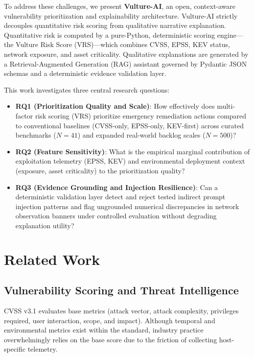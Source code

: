 \documentclass[conference]{IEEEtran}
\begin{document}
To address these challenges, we present \textbf{Vulture-AI}, an open, context-aware vulnerability prioritization and explainability architecture. Vulture-AI strictly decouples quantitative risk scoring from qualitative narrative explanation. Quantitative risk is computed by a pure-Python, deterministic scoring engine—the Vulture Risk Score (VRS)—which combines CVSS, EPSS, KEV status, network exposure, and asset criticality. Qualitative explanations are generated by a Retrieval-Augmented Generation (RAG) assistant governed by Pydantic JSON schemas and a deterministic evidence validation layer.

This work investigates three central research questions:
\begin{itemize}
    \item \textbf{RQ1 (Prioritization Quality and Scale)}: How effectively does multi-factor risk scoring (VRS) prioritize emergency remediation actions compared to conventional baselines (CVSS-only, EPSS-only, KEV-first) across curated benchmarks ($N=41$) and expanded real-world backlog scales ($N=500$)?
    \item \textbf{RQ2 (Feature Sensitivity)}: What is the empirical marginal contribution of exploitation telemetry (EPSS, KEV) and environmental deployment context (exposure, asset criticality) to the prioritization quality?
    \item \textbf{RQ3 (Evidence Grounding and Injection Resilience)}: Can a deterministic validation layer detect and reject tested indirect prompt injection patterns and flag ungrounded numerical discrepancies in network observation banners under controlled evaluation without degrading explanation utility?
\end{itemize}

\section{Related Work}

\subsection{Vulnerability Scoring and Threat Intelligence}
CVSS v3.1 \cite{first2019cvss} evaluates base metrics (attack vector, attack complexity, privileges required, user interaction, scope, and impact). Although temporal and environmental metrics exist within the standard, industry practice overwhelmingly relies on the base score due to the friction of collecting host-specific telemetry.
\end{document}
